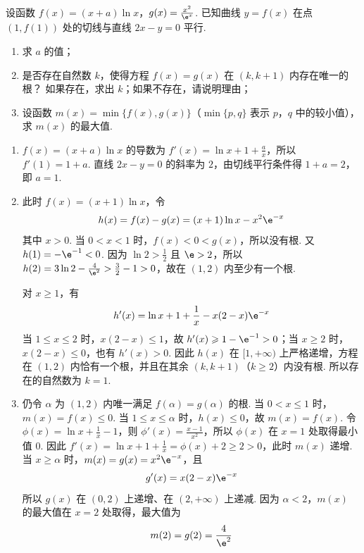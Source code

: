 \begin{problem}
设函数 \(f(x) = (x + a)\ln x\)，\(g(x) = \frac{x^2}{\e^x}\). 已知曲线 \( y = f(x) \) 在点 \((1, f(1))\) 处的切线与直线 \( 2x - y = 0 \) 平行.

\begin{enumerate}
\item 求 \(a\) 的值；
\item 是否存在自然数 \(k\)，使得方程 \(f(x) = g(x)\) 在 \((k, k + 1)\) 内存在唯一的根？ 如果存在，求出 \(k\)；如果不存在，请说明理由；
\item 设函数 \(m(x) = \min \{f(x), g(x)\}\)（\(\min \{p, q\}\) 表示 \(p\)，\(q\) 中的较小值），求 \(m(x)\) 的最大值.
\end{enumerate}
\end{problem}

\begin{solution}
\begin{enumerate}
\item \(f(x)=(x+a)\ln x\) 的导数为 \(f'(x)=\ln x+1+\frac ax\)，所以 \(f'(1)=1+a\). 直线 \(2x-y=0\) 的斜率为 \(2\)，由切线平行条件得 \(1+a=2\)，即 \(a=1\).

\item 此时 \(f(x)=(x+1)\ln x\)，令
\[
h(x)=f(x)-g(x)=(x+1)\ln x-x^2\e^{-x}
\]
其中 \(x>0\).
当 \(0<x<1\) 时，\(f(x)<0<g(x)\)，所以没有根. 又
\(h(1)=-\e^{-1}<0\). 因为 \(\ln2>\frac12\) 且 \(\e>2\)，所以
\(h(2)=3\ln2-\frac4{\e^2}>\frac32-1>0\)，故在 \((1,2)\) 内至少有一个根.

对 \(x\geqslant1\)，有
\[
h'(x)=\ln x+1+\frac1x-x(2-x)\e^{-x}
\]
当 \(1\leqslant x\leqslant2\) 时，\(x(2-x)\leqslant1\)，故
\(h'(x)\geqslant1-\e^{-1}>0\)；当 \(x\geqslant2\) 时，\(x(2-x)\leqslant0\)，也有 \(h'(x)>0\). 因此 \(h(x)\) 在 \([1,+\infty)\) 上严格递增，方程在 \((1,2)\) 内恰有一个根，并且在其余 \((k,k+1)\)（\(k\geqslant2\)）内没有根. 所以存在的自然数为 \(k=1\).

\item 仍令 \(\alpha\) 为 \((1,2)\) 内唯一满足 \(f(\alpha)=g(\alpha)\) 的根. 当 \(0<x\leqslant1\) 时，\(m(x)=f(x)\leqslant0\). 当 \(1\leqslant x\leqslant\alpha\) 时，\(h(x)\leqslant0\)，故 \(m(x)=f(x)\). 令 \(\phi(x)=\ln x+\frac1x-1\)，则 \(\phi'(x)=\frac{x-1}{x^2}\)，所以 \(\phi(x)\) 在 \(x=1\) 处取得最小值 \(0\). 因此 \(f'(x)=\ln x+1+\frac1x=\phi(x)+2\geqslant2>0\)，此时 \(m(x)\) 递增. 当 \(x\geqslant\alpha\) 时，\(m(x)=g(x)=x^2\e^{-x}\)，且
\[
g'(x)=x(2-x)\e^{-x}
\]
所以 \(g(x)\) 在 \((0,2)\) 上递增、在 \((2,+\infty)\) 上递减. 因为 \(\alpha<2\)，\(m(x)\) 的最大值在 \(x=2\) 处取得，最大值为
\[
m(2)=g(2)=\frac4{\e^2}
\]
\end{enumerate}
\end{solution}

